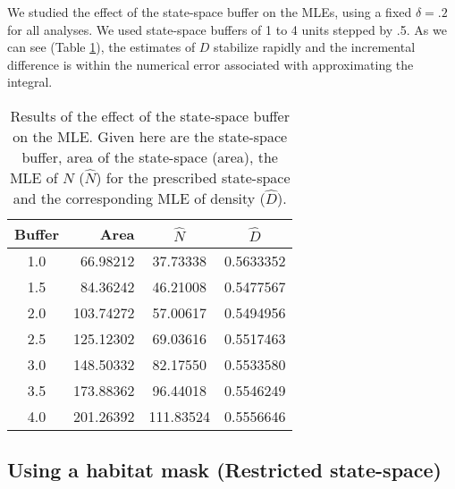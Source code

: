 We studied the effect of the state-space buffer on the MLEs,
using a fixed $\delta = .2$ for all analyses. 
We used state-space buffers
of 1 to 4 units stepped by .5.
 As we can see (Table \ref{mle.tab.buff}), 
the estimates of $D$ stabilize rapidly and the incremental difference
is within the numerical error associated with approximating the
integral.  



\begin{table}[ht]
\centering
\caption{Results of the effect of the state-space buffer on the MLE. 
Given here are the state-space buffer, area of the state-space (area), the
MLE of $N$ ($\hat{N}$) for the prescribed state-space and the corresponding MLE of
density ($\hat{D}$).}
\begin{tabular}{crcc}
\hline \hline
Buffer   & Area & $\hat{N}$ & $\hat{D}$ \\ \hline
 1.0 & 66.98212 & 37.73338 & 0.5633352  \\
 1.5 & 84.36242 & 46.21008 & 0.5477567  \\
 2.0 &103.74272 & 57.00617 & 0.5494956  \\
 2.5 &125.12302 & 69.03616 & 0.5517463  \\
 3.0 &148.50332 & 82.17550 & 0.5533580  \\ 
 3.5 &173.88362 & 96.44018 & 0.5546249  \\
 4.0 &201.26392 &111.83524 & 0.5556646  \\  \hline
\end{tabular}
\label{mle.tab.buff}
\end{table}


\subsection{Using a habitat mask (Restricted state-space)}
\label{mle.sec.shapefile}

